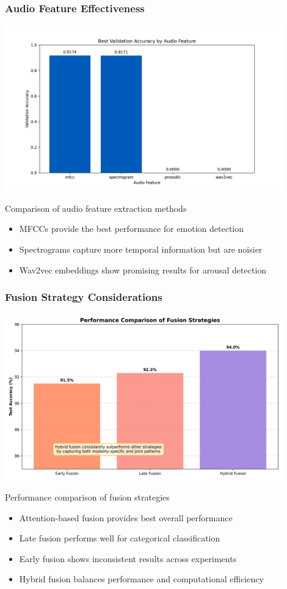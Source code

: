 \documentclass{beamer}
\begin{document}
\begin{frame}
\frametitle{Audio Feature Effectiveness}
\begin{center}
\includegraphics[width=0.9\textwidth]{figures/audio_feature_comparison.png}
\caption{Comparison of audio feature extraction methods}
\end{center}

\begin{itemize}
    \item MFCCs provide the best performance for emotion detection
    \item Spectrograms capture more temporal information but are noisier
    \item Wav2vec embeddings show promising results for arousal detection
\end{itemize}
\end{frame}

\begin{frame}
\frametitle{Fusion Strategy Considerations}
\begin{center}
\includegraphics[width=0.9\textwidth]{figures/fusion_performance.png}
\caption{Performance comparison of fusion strategies}
\end{center}

\begin{itemize}
    \item Attention-based fusion provides best overall performance
    \item Late fusion performs well for categorical classification
    \item Early fusion shows inconsistent results across experiments
    \item Hybrid fusion balances performance and computational efficiency
\end{itemize}
\end{frame}
\end{document}
